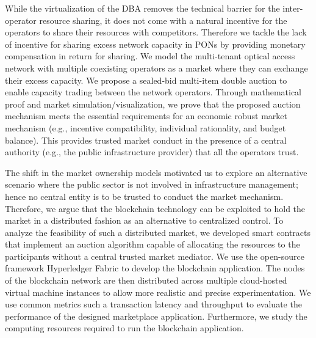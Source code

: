 While the virtualization of the \ac{DBA} removes the technical barrier for the inter-operator resource sharing, it does not come with a natural incentive for the operators to share their resources with competitors. Therefore we tackle the lack of incentive for sharing excess network capacity in \acp{PON} by providing monetary compensation in return for sharing. We model the multi-tenant optical access network with multiple coexisting operators as a market where they can exchange their excess capacity. We propose a sealed-bid multi-item double auction to enable capacity trading between the network operators. Through mathematical proof and market simulation/visualization, we prove that the proposed auction mechanism meets the essential requirements for an economic robust market mechanism (e.g., incentive compatibility, individual rationality, and budget balance). This provides trusted market conduct in the presence of a central authority (e.g., the public infrastructure provider) that all the operators trust. 

The shift in the market ownership models motivated us to explore an alternative scenario where the public sector is not involved in infrastructure management; hence no central entity is to be trusted to conduct the market mechanism. Therefore, we argue that the blockchain technology can be exploited to hold the market in a distributed fashion as an alternative to centralized control. To analyze the feasibility of such a distributed market, we developed smart contracts that implement an auction algorithm capable of allocating the resources to the participants without a central trusted market mediator. We use the open-source framework Hyperledger Fabric to develop the blockchain application. The nodes of the blockchain network are then distributed across multiple cloud-hosted virtual machine instances to allow more realistic and precise experimentation. We use common metrics such a transaction latency and throughput to evaluate the performance of the designed marketplace application. Furthermore, we study the computing resources required to run the blockchain application.



